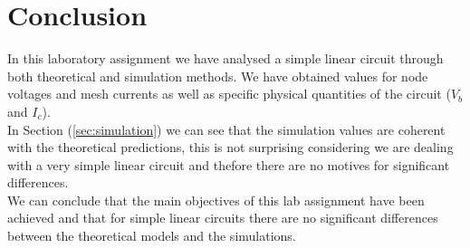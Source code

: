 \section{Conclusion}
\label{sec:conclusion}

In this laboratory assignment we have analysed a simple linear circuit through both theoretical
and simulation methods. We have obtained values for node voltages and mesh currents as well as specific
physical quantities of the circuit ($V_b$ and $I_c$).
\\
In Section (\ref{sec:simulation}) we can see that the simulation values are coherent with the
theoretical predictions, this is not surprising considering we are dealing with a very simple linear
circuit and thefore there are no motives for significant differences.
\\
We can conclude that the main objectives of this lab assignment have been achieved and that for simple linear
circuits there are no significant differences between the theoretical models and the simulations.